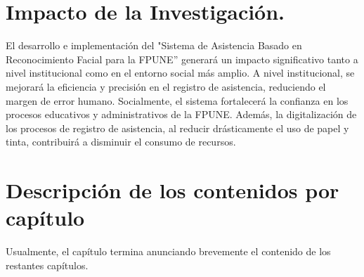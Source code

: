 \section{Impacto de la Investigación.} El desarrollo e implementación del "Sistema de Asistencia Basado en Reconocimiento Facial para la FPUNE” generará un impacto significativo tanto a
nivel institucional como en el entorno social más amplio. A nivel institucional,
se mejorará la eficiencia y precisión en el registro de asistencia, reduciendo el
margen de error humano. Socialmente, el sistema fortalecerá la confianza en
los procesos educativos y administrativos de la FPUNE. Además, la digitalización de los procesos de registro de asistencia, al reducir drásticamente el uso
de papel y tinta, contribuirá a disminuir el consumo de recursos.









\section{Descripción de los contenidos por capítulo}
Usualmente, el capítulo termina anunciando brevemente el contenido de los restantes capítulos.

